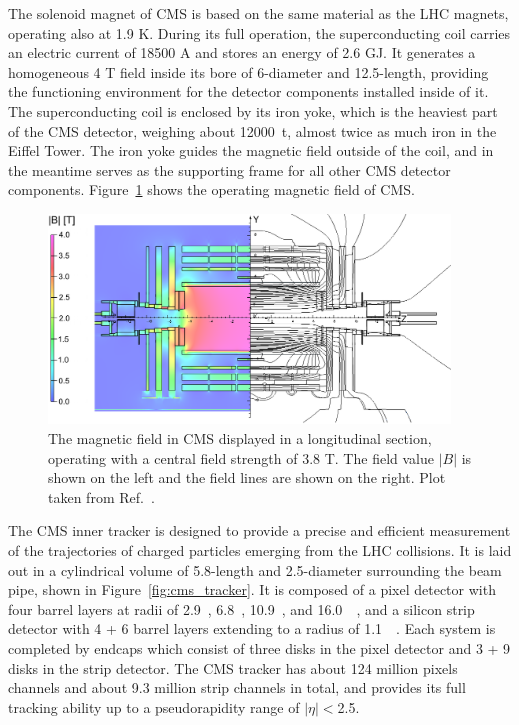 The solenoid magnet of CMS is based on the same material as the LHC magnets, operating also at 1.9 K.
During its full operation, the superconducting coil carries an electric current of 18500 A and stores an energy of 2.6 GJ.
It generates a homogeneous 4 T field inside its bore of 6-\meter diameter and 12.5-\meter length,
providing the functioning environment for the detector components installed inside of it.
The superconducting coil is enclosed by its iron yoke, which is the heaviest part of the CMS detector, 
weighing about 12000~t, almost twice as much iron in the Eiffel Tower.
The iron yoke guides the magnetic field outside of the coil, and in the meantime serves as the supporting frame for all other CMS detector components.
Figure~\ref{fig:cms_field} shows the operating magnetic field of CMS.

\begin{figure}[!htb]
    \centering
    \captionsetup{justification=justified}
    \includegraphics[width=0.95\textwidth]{pics/LHC_CMS/CMS_field.png}
    \caption{The magnetic field in CMS displayed in a longitudinal section, operating with a central field strength of 3.8 T.
             The field value $|B|$ is shown on the left and the field lines are shown on the right.
             Plot taken from Ref.~\cite{Collaboration_2010}. }
    \label{fig:cms_field}
\end{figure}


The CMS inner tracker is designed to provide a precise and efficient measurement of the trajectories of charged particles emerging from the LHC collisions.
It is laid out in a cylindrical volume of 5.8-\meter length and 2.5-\meter diameter surrounding the beam pipe, shown in Figure~\ref{fig:cms_tracker}.
It is composed of a pixel detector with four barrel layers at radii of 2.9~\cm, 6.8~\cm, 10.9~\cm, and 16.0~\cm~\cite{phase1_tracker},
and a silicon strip detector with 4 + 6 barrel layers extending to a radius of 1.1~\meter~\cite{Collaboration_2008}.
Each system is completed by endcaps which consist of three disks in the pixel detector and 3 + 9 disks in the strip detector.
The CMS tracker has about 124 million pixels channels and about 9.3 million strip channels in total,
and provides its full tracking ability up to a pseudorapidity range of $|\eta| < $2.5.

